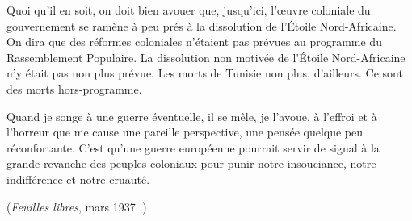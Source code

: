 \documentclass[french,twoside]{book} %
\begin{document}
Quoi qu'il en soit, on doit bien avouer que, jusqu'ici, l'œuvre coloniale du gouvernement se ramène à peu prés à la dissolution de l'Étoile Nord-Africaine. On dira que des réformes coloniales n'étaient pas prévues au programme du Rassemblement Populaire. La dissolution non motivée de l'Étoile Nord-Africaine n'y était pas non plus prévue. Les morts de Tunisie non plus, d'ailleurs. Ce sont des morts hors-programme.\par
Quand je songe à une guerre éventuelle, il se mêle, je l'avoue, à l'effroi et à l'horreur que me cause une pareille perspective, une pensée quelque peu réconfortante. C'est qu'une guerre européenne pourrait servir de signal à la grande revanche des peuples coloniaux pour punir notre insouciance, notre indifférence et notre cruauté.\par
({\itshape Feuilles libres}, mars 1937 .)\par

\begin{center}
\end{center}
\end{document}
